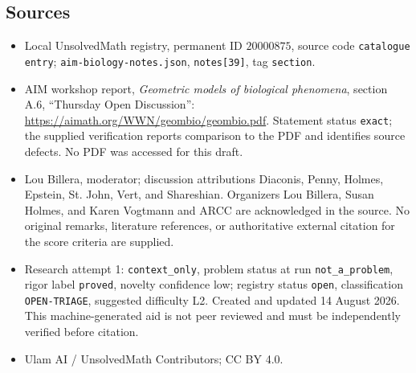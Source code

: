 \documentclass[11pt]{article}
\begin{document}
\subsection{Sources}
\begin{itemize}
\item Local UnsolvedMath registry, permanent ID \(20000875\), source code \texttt{catalogue entry}; \texttt{aim-biology-notes.json}, \texttt{notes[39]}, tag \texttt{section}.
\item AIM workshop report, \emph{Geometric models of biological phenomena}, section A.6, ``Thursday Open Discussion'': \url{https://aimath.org/WWN/geombio/geombio.pdf}. Statement status \texttt{exact}; the supplied verification reports comparison to the PDF and identifies source defects. No PDF was accessed for this draft.
\item Lou Billera, moderator; discussion attributions Diaconis, Penny, Holmes, Epstein, St. John, Vert, and Shareshian. Organizers Lou Billera, Susan Holmes, and Karen Vogtmann and ARCC are acknowledged in the source. No original remarks, literature references, or authoritative external citation for the score criteria are supplied.
\item Research attempt 1: \texttt{context\_only}, problem status at run \texttt{not\_a\_problem}, rigor label \texttt{proved}, novelty confidence low; registry status \texttt{open}, classification \texttt{OPEN-TRIAGE}, suggested difficulty L2. Created and updated 14 August 2026. This machine-generated aid is not peer reviewed and must be independently verified before citation.
\item Ulam AI / UnsolvedMath Contributors; CC BY 4.0.
\end{itemize}
\end{document}
